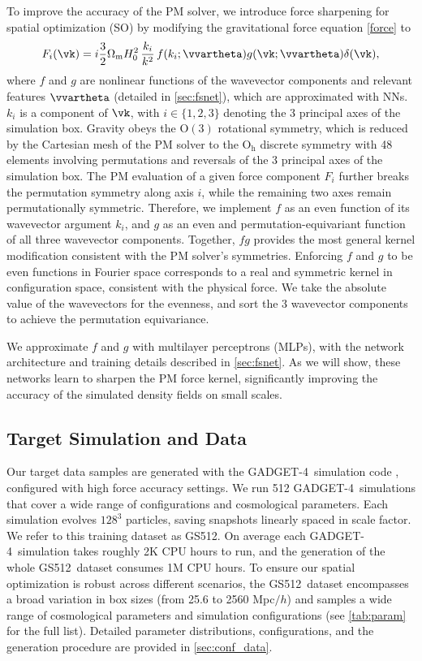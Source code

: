 \documentclass[modern, trackchanges, dvipsnames]{aastex631}
\newcommand{\GADGET}{{{\fontsize{10pt}{12pt}\selectfont GADGET}-4}}
\newcommand{\GSDATA}{{GS512}}
\newcommand{\Omegam}{\Omega_\mathrm{m}}
\begin{document}
To improve the accuracy of the PM solver, we introduce force sharpening for
spatial optimization (SO) by modifying the gravitational force equation
\eqref{force} to
%
\begin{equation}
F_i(\vk) = i \frac32 \Omegam H_0^2 \,\frac{k_i}{k^2}\,
                    f(k_i; \vvartheta) g(\vk; \vvartheta) \delta(\vk),
\label{force_so}
\end{equation}
%
where $f$ and $g$ are nonlinear functions of the wavevector components and
relevant features $\vvartheta$ (detailed in \autoref{sec:fsnet}), which are
approximated with NNs.
$k_i$ is a component of $\vk$, with $i\in\{1,2,3\}$ denoting the 3
principal axes of the simulation box.
Gravity obeys the $\mathrm{O}(3)$ rotational symmetry, which is reduced by the
Cartesian mesh of the PM solver to the $\mathrm{O_h}$ discrete symmetry with
48 elements involving permutations and reversals of the 3 principal axes of the
simulation box.
The PM evaluation of a given force component $F_i$ further breaks the
permutation symmetry along axis $i$, while the remaining two axes remain
permutationally symmetric.
Therefore, we implement $f$ as an even function of its wavevector argument
$k_i$, and $g$ as an even and permutation-equivariant function of all three
wavevector components.
Together, $fg$ provides the most general kernel modification consistent with the
PM solver's symmetries.
Enforcing $f$ and $g$ to be even functions in Fourier space corresponds to a
real and symmetric kernel in configuration space, consistent with the physical
force.
We take the absolute value of the wavevectors for the evenness, and sort
the 3 wavevector components to achieve the permutation equivariance.

We approximate $f$ and $g$ with multilayer perceptrons (MLPs), with
the network architecture and training details described in
\autoref{sec:fsnet}.
As we will show, these networks learn to sharpen the PM force kernel,
significantly improving the accuracy of the simulated density fields on small
scales.


\subsection{Target Simulation and Data}

Our target data samples are generated with the \GADGET\ simulation code
\citep{GADGET-4}, configured with high force accuracy settings.
We run 512 \GADGET\ simulations that cover a wide range of
configurations and cosmological parameters.
Each simulation evolves $128^3$ particles, saving snapshots linearly spaced in
scale factor.
We refer to this training dataset as \GSDATA.
On average each \GADGET\ simulation takes roughly 2K CPU hours to run,
and the generation of the whole \GSDATA\ dataset consumes 1M CPU hours.
To ensure our spatial optimization is robust across different scenarios, the
\GSDATA\ dataset encompasses a broad variation in box sizes (from 25.6 to 2560
Mpc$/h$) and samples a wide range of cosmological parameters and simulation
configurations (see \autoref{tab:param} for the full list).
Detailed parameter distributions, configurations, and the generation procedure
are provided in \autoref{sec:conf_data}.
\end{document}
